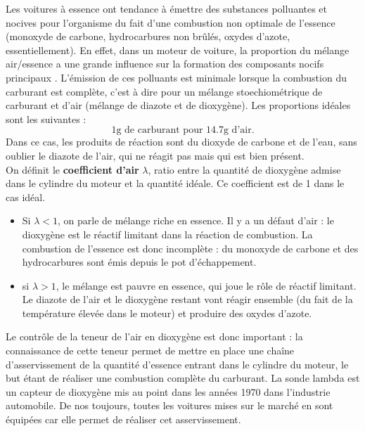 \documentclass[11pt,a4paper]{report}
\begin{document}
Les voitures à essence ont tendance à émettre des substances polluantes et nocives pour l'organisme du fait d'une combustion non optimale de l'essence (monoxyde de carbone, hydrocarbures non brûlés, oxydes d'azote, essentiellement). En effet, dans un moteur de voiture, la proportion du mélange air/essence a une grande influence sur la formation des composants nocifs principaux . L'émission de ces polluants est minimale lorsque la combustion du carburant est complète, c'est à dire pour un mélange stoechiométrique de carburant et d'air (mélange de diazote et de dioxygène). Les proportions idéales sont les suivantes :
\begin{equation}
	\boxed{\text{1g de carburant pour 14.7g d'air}}.
\end{equation}
Dans ce cas, les produits de réaction sont du dioxyde de carbone et de l'eau, sans oublier le diazote de l'air, qui ne réagit pas mais qui est bien présent.\\ 

On définit le \textbf{coefficient d'air} $\lambda$, ratio entre la quantité de dioxygène admise dans le cylindre du moteur et la quantité idéale. Ce coefficient est de 1 dans le cas idéal. \begin{itemize}
	\item Si $\lambda < 1$, on parle de mélange riche en essence. Il y a un défaut d'air : le dioxygène est le réactif limitant dans la réaction de combustion. La combustion de l'essence est donc incomplète : du monoxyde de carbone et des hydrocarbures sont émis depuis le pot d'échappement.\\
	\item si $\lambda > 1$, le mélange est pauvre en essence, qui joue le rôle de réactif limitant. Le diazote de l'air et le dioxygène restant vont réagir ensemble (du fait de la température élevée dans le moteur) et produire des oxydes d'azote.
\end{itemize}

Le contrôle de la teneur de l'air en dioxygène est donc important : la connaissance de cette teneur permet de mettre en place une chaîne d'asservissement de la quantité d'essence entrant dans le cylindre du moteur, le but étant de réaliser une combustion complète du carburant. La sonde lambda est un capteur de dioxygène mis au point dans les années 1970 dans l'industrie automobile. De nos toujours, toutes les voitures mises sur le marché en sont équipées car elle permet de réaliser cet asservissement.\\
\end{document}
